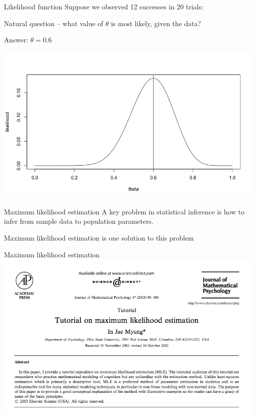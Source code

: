\documentclass[presentation]{beamer}
\begin{document}
\begin{frame}[label=sec-7]{Likelihood function}
Suppose we observed 12 successes in 20 trials:

\vspace{1cm}

Natural question -- what value of $\theta$ is \alert{most likely}, given the data?

Answer: $\theta=0.6$

\includegraphics[width=.9\linewidth]{figures/week2/maxLikelihood.png}
\end{frame}

\begin{frame}[label=sec-8]{Maximum likelihood estimation}
A key problem in statistical inference is how to infer from \alert{sample data} to \alert{population parameters}.

\vspace{1cm}

Maximum likelihood estimation is one solution to this problem
\end{frame}

\begin{frame}[label=sec-9]{Maximum likelihood estimation}
\includegraphics[width=.9\linewidth]{figures/week2/mlePaper.png}
\end{frame}
\end{document}
